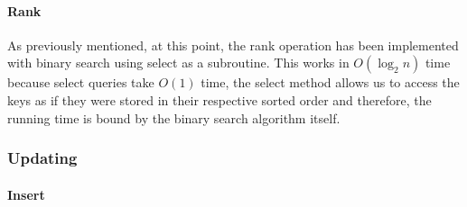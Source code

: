 \paragraph{Rank}
As previously mentioned, at this point, the rank operation has been implemented with binary search using select as a subroutine. This works in $O(\log_2 n)$ time because select queries take $O(1)$ time, the select method allows us to access the keys as if they were stored in their respective sorted order and therefore, the running time is bound by the binary search algorithm itself.

\subsubsection{Updating}

\paragraph{Insert} \label{sec:binaryRankInsertExample}

